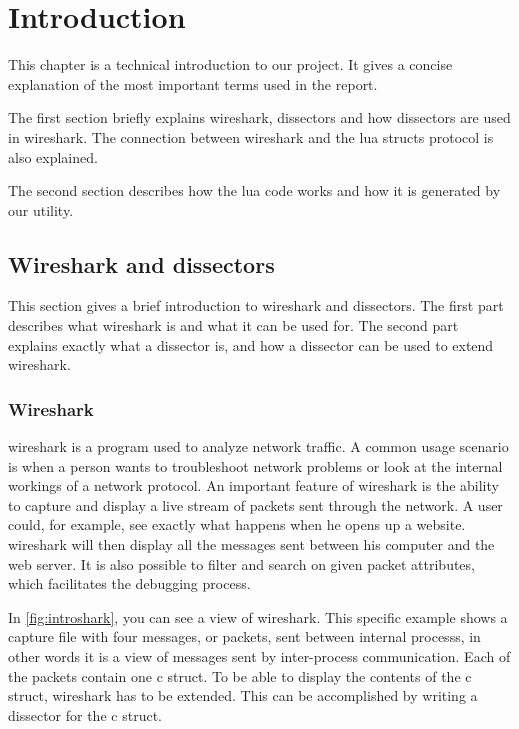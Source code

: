 \chapter{Introduction}

This chapter is a technical introduction to our project.
It gives a concise explanation of the most important terms used in the report.

The first section briefly explains \Gls{wireshark}, \glspl{dissector} and how \glspl{dissector} are used in \Gls{wireshark}.
The connection between \Gls{wireshark} and the \Gls{lua} \glspl{struct} \gls{protocol} is also explained.

The second section describes how the \Gls{lua} code works and how it is generated by our \gls{utility}.

\section{Wireshark and dissectors}
This section gives a brief introduction to \Gls{wireshark} and \glspl{dissector}.
The first part describes what \Gls{wireshark} is and what it can be used for.
The second part explains exactly what a \gls{dissector} is, and how a \gls{dissector} can be used to extend \Gls{wireshark}.

\subsection{Wireshark}
\Gls{wireshark} is a program used to analyze network traffic. A common usage scenario is when a person wants to troubleshoot network problems or
look at the internal workings of a network \gls{protocol}. An important feature of \Gls{wireshark} is the ability to capture and display a live stream of \glspl{packet} sent through the network. 
A user could, for example, see exactly what happens when he opens up a website. \Gls{wireshark} will then display all the messages
sent between his computer and the web server. It is also possible to filter and search on given \gls{packet} attributes, which facilitates the debugging \gls{process}.

In \autoref{fig:introshark}, you can see a view of \Gls{wireshark}.
This specific example shows a capture file with four messages, or \glspl{packet}, sent between internal \glspl{process}, in other words
it is a view of messages sent by inter-\gls{process} communication. Each of the \glspl{packet} contain one \Gls{c} \gls{struct}.
To be able to display the contents of the \Gls{c} \gls{struct}, \Gls{wireshark} has to be extended. 
This can be accomplished by writing a \gls{dissector} for the \Gls{c} \gls{struct}.

